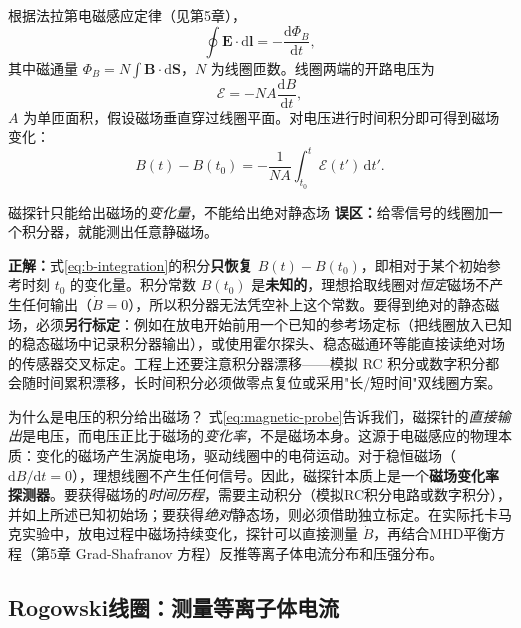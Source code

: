 \documentclass[12pt,a4paper,openany,oneside]{book}
\newcommand{\diff}{\mathrm{d}}
\newcommand{\vect}[1]{\bm{#1}}
\begin{document}
根据法拉第电磁感应定律（见第5章），
\begin{equation}
\oint \vect{E}\cdot\diff\vect{l} = -\frac{\diff\Phi_B}{\diff t},
\label{eq:faraday}
\end{equation}
其中磁通量 $\Phi_B = N \int \vect{B}\cdot\diff\vect{S}$，$N$ 为线圈匝数。线圈两端的开路电压为
\begin{equation}
\mathcal{E} = -N A \frac{\diff B}{\diff t},
\label{eq:magnetic-probe}
\end{equation}
$A$ 为单匝面积，假设磁场垂直穿过线圈平面。对电压进行时间积分即可得到磁场变化：
\begin{equation}
B(t) - B(t_0) = -\frac{1}{NA}\int_{t_0}^{t} \mathcal{E}(t')\,\diff t'.
\label{eq:b-integration}
\end{equation}

\begin{warning}{磁探针只能给出磁场的\emph{变化量}，不能给出绝对静态场}{}
\textbf{误区：}给零信号的线圈加一个积分器，就能测出任意静磁场。

\textbf{正解：}式\eqref{eq:b-integration}的积分\textbf{只恢复 $B(t)-B(t_0)$}，即相对于某个初始参考时刻 $t_0$ 的变化量。积分常数 $B(t_0)$ 是\textbf{未知的}，理想拾取线圈对\emph{恒定}磁场不产生任何输出（$\dot B = 0$），所以积分器无法凭空补上这个常数。要得到绝对的静态磁场，必须\textbf{另行标定}：例如在放电开始前用一个已知的参考场定标（把线圈放入已知的稳态磁场中记录积分器输出），或使用霍尔探头、稳态磁通环等能直接读绝对场的传感器交叉标定。工程上还要注意积分器漂移——模拟 RC 积分或数字积分都会随时间累积漂移，长时间积分必须做零点复位或采用"长/短时间"双线圈方案。
\end{warning}

\begin{insight}{为什么是电压的积分给出磁场？}{}
式\eqref{eq:magnetic-probe}告诉我们，磁探针的\emph{直接输出}是电压，而电压正比于磁场的\emph{变化率}，不是磁场本身。这源于电磁感应的物理本质：变化的磁场产生涡旋电场，驱动线圈中的电荷运动。对于稳恒磁场（$\diff B/\diff t = 0$），理想线圈不产生任何信号。因此，磁探针本质上是一个\textbf{磁场变化率探测器}。要获得磁场的\emph{时间历程}，需要主动积分（模拟RC积分电路或数字积分），并如上所述已知初始场；要获得\emph{绝对}静态场，则必须借助独立标定。在实际托卡马克实验中，放电过程中磁场持续变化，探针可以直接测量 $\dot{B}$，再结合MHD平衡方程（第5章 Grad-Shafranov 方程）反推等离子体电流分布和压强分布。
\end{insight}

\subsection{Rogowski线圈：测量等离子体电流}
\end{document}
